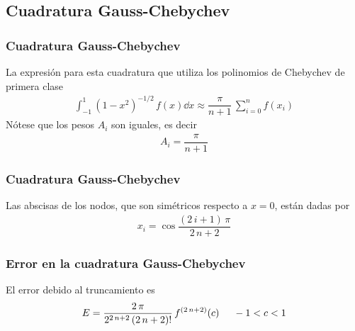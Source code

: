 \subsection{Cuadratura Gauss-Chebychev}
\begin{frame}
\frametitle{Cuadratura Gauss-Chebychev}
La expresión para esta cuadratura que utiliza los polinomios de Chebychev de primera clase
\begin{align*}
\int_{-1}^{1} (1 -x^{2})^{-1/2} \, f(x) \dd{x} \approx \dfrac{\pi}{n + 1} \, \sum_{i=0}^{n} f(x_{i})
\end{align*}
Nótese que los pesos $A_{i}$ son iguales, es decir
\begin{align*}
A_{i} = \dfrac{\pi}{n + 1}
\end{align*}
\end{frame}
\begin{frame}
\frametitle{Cuadratura Gauss-Chebychev}
Las abscisas de los nodos, que son simétricos respecto a $x = 0$, están dadas por
\begin{align*}
x_{i} = \cos \dfrac{(2 \, i + 1) \, \pi}{2 \, n + 2}
\end{align*}
\end{frame}
\begin{frame}
\frametitle{Error en la cuadratura Gauss-Chebychev}
El error debido al truncamiento es
\begin{align*}
E = \dfrac{2 \, \pi}{2^{2 \, n +2} \, (2 \, n + 2)!} \, f^{(2 \, n + 2)} (c)  \hspace{0.5cm} -1 < c < 1
\end{align*}
\end{frame}
